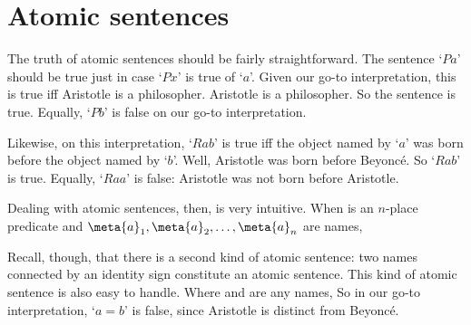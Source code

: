 \section{Atomic sentences}
The truth of atomic sentences should be fairly straightforward. The sentence `$Pa$' should be true just in case `$Px$' is true of `$a$'. Given our go-to interpretation, this is true iff Aristotle is a philosopher. Aristotle is a philosopher. So the sentence is true. Equally, `$Pb$' is false on our go-to interpretation.

Likewise, on this interpretation, `$Rab$' is true iff the object named by `$a$' was born before the object named by `$b$'. Well, Aristotle was born before Beyonc\'e. So `$Rab$' is true. Equally, `$Raa$' is false: Aristotle was not born before Aristotle. 

Dealing with atomic sentences, then, is very intuitive. When  is an $n$-place predicate and $\meta{a}_1, \meta{a}_{2}, \ldots, \meta{a}_{n}$ are names, 

Recall, though, that there is a second kind of atomic sentence: two names connected by an identity sign constitute an atomic sentence. This kind of atomic sentence is also easy to handle. Where  and  are any names, 
So in our go-to interpretation, `$a = b$' is false, since Aristotle is distinct from Beyonc\'e.


